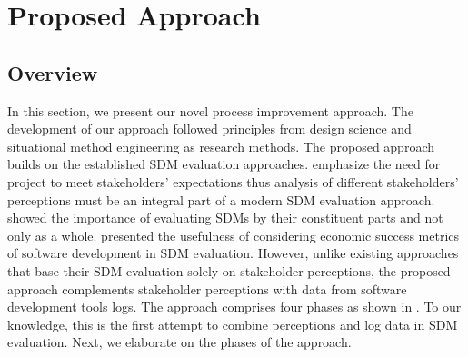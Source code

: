 \section{Proposed Approach}


\subsection{Overview}

In this section, we present our novel process improvement approach. The development of our
approach followed principles from design science \citep{Hevner2004}  and
situational method engineering \citep{DBLP:books/sp/Henderson-SellersRAR14} as research
methods. The proposed approach builds on the established SDM evaluation approaches.  emphasize the need for project to meet stakeholders’ expectations thus analysis of different
stakeholders’ perceptions must be an integral part of a modern SDM evaluation approach.  showed the importance of evaluating SDMs by their constituent parts and not only
as a whole.  presented the usefulness of considering economic success
metrics of software development in SDM evaluation. However, unlike existing approaches that base
their SDM evaluation solely on stakeholder perceptions, the proposed approach complements
stakeholder perceptions with data from software development tools logs. The approach comprises
four phases as shown in . To our knowledge, this is the first attempt to combine perceptions
and log data in SDM evaluation. Next, we elaborate on the phases of the approach.



